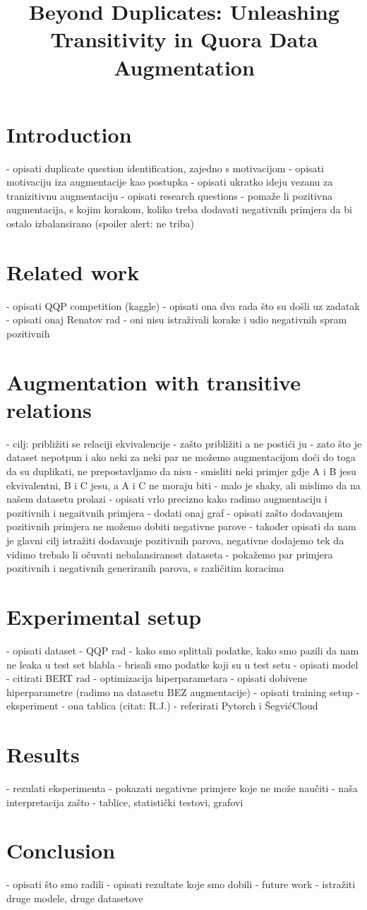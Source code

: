 \documentclass[10pt, a4paper]{article}
\title{Beyond Duplicates: Unleashing Transitivity in Quora Data Augmentation}
\begin{document}
\maketitleabstract

\section{Introduction}
- opisati duplicate question identification, zajedno s motivacijom
- opisati motivaciju iza augmentacije kao postupka
- opisati ukratko ideju vezanu za tranizitivnu augmentaciju
- opisati research questions - pomaže li pozitivna augmentacija, s kojim korakom, koliko treba dodavati negativnih primjera da bi ostalo izbalansirano (spoiler alert: ne triba)

\section{Related work}
- opisati QQP competition (kaggle)
- opisati ona dva rada što su došli uz zadatak
- opisati onaj Renatov rad - oni nisu istraživali korake i udio negativnih spram pozitivnih

\section{Augmentation with transitive relations}
- cilj: približiti se relaciji ekvivalencije
- zašto približiti a ne postići ju - zato što je dataset nepotpun i ako neki za neki par ne možemo augmentacijom doći do toga da su duplikati, ne prepostavljamo da nisu
- smisliti neki primjer gdje A i B jesu ekvivalentni, B i C jesu, a A i C ne moraju biti - malo je shaky, ali mislimo da na našem datasetu prolazi
- opisati vrlo precizno kako radimo augmentaciju i pozitivnih i negaitvnih primjera - dodati onaj graf
- opisati zašto dodavanjem pozitivnih primjera ne možemo dobiti negativne parove
- također opisati da nam je glavni cilj istražiti dodavanje pozitivnih parova, negativne dodajemo tek da vidimo trebalo li očuvati nebalansiranost dataseta
- pokažemo par primjera pozitivnih i negativnih generiranih parova, s različitim koracima

\section{Experimental setup}
- opisati dataset - QQP rad
- kako smo splittali podatke, kako smo pazili da nam ne leaka u test set blabla - brisali smo podatke koji su u test setu
- opisati model - citirati BERT rad
- optimizacija hiperparametara - opisati dobivene hiperparametre (radimo na datasetu BEZ augmentacije)
- opisati training setup
- eksperiment - ona tablica (citat: R.J.)
- referirati Pytorch i ŠegvićCloud

\section{Results}
- rezulati eksperimenta - pokazati negativne primjere koje ne može naučiti - naša interpretacija zašto
- tablice, statistički testovi, grafovi

\section{Conclusion}
- opisati što smo radili
- opisati rezultate koje smo dobili
- future work - istražiti druge modele, druge datasetove
\end{document}
